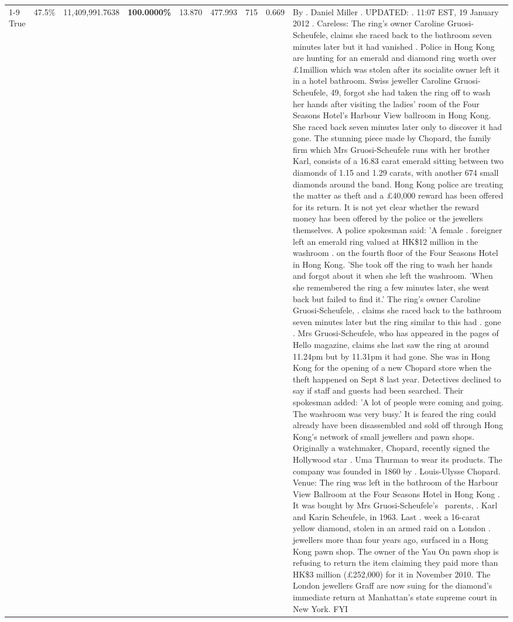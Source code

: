 \begin{table}[H]
\begin{tabular}{lllrlllll}
\cline{1-9}
True & 47.5\% & 11,409,991.7638 & \bfseries \color{red} 100.0000\% & 13.870 & 477.993 & 715 & 0.669 & By . Daniel Miller . UPDATED: . 11:07 EST, 19 January 2012 . Careless: The ring's owner Caroline Gruosi-Scheufele, claims she raced back to the bathroom seven minutes later but it had vanished . Police in Hong Kong are hunting for an emerald and diamond ring worth over £1million which was stolen after its socialite owner left it in a hotel bathroom. Swiss jeweller Caroline Gruosi-Scheufele, 49, forgot she had taken the ring off to wash her hands after visiting the ladies' room of the Four Seasons Hotel's Harbour View ballroom in Hong Kong. She raced back seven minutes later only to discover it had gone. The stunning piece made by Chopard, the family firm which Mrs Gruosi-Scheufele runs with her brother Karl, consists of a 16.83 carat emerald sitting between two diamonds of 1.15 and 1.29 carats, with another 674 small diamonds around the band. Hong Kong police are treating the matter as theft and a £40,000 reward has been offered for its return. It is not yet clear whether the reward money has been offered by the police or the jewellers themselves. A police spokesman said: 'A female . foreigner left an emerald ring valued at HK\$12 million in the washroom . on the fourth floor of the Four Seasons Hotel in Hong Kong. 'She took off the ring to wash her hands and forgot about it when she left the washroom. 'When she remembered the ring a few minutes later, she went back but failed to find it.' The ring's owner Caroline Gruosi-Scheufele, . claims she raced back to the bathroom seven minutes later but the ring similar to this had . gone . Mrs Gruosi-Scheufele, who has appeared in the pages of Hello magazine, claims she last saw the ring at around 11.24pm but by 11.31pm it had gone. She was in Hong Kong for the opening of a new Chopard store when the theft happened on Sept 8 last year. Detectives declined to say if staff and guests had been searched. Their spokesman added: 'A lot of people were coming and going. The washroom was very busy.' It is feared the ring could already have been disassembled and sold off through Hong Kong's network of small jewellers and pawn shops. Originally a watchmaker, Chopard, recently signed the Hollywood star . Uma Thurman to wear its products. The company was founded in 1860 by . Louis-Ulysse Chopard. Venue: The ring was left in the bathroom of the Harbour View Ballroom at the Four Seasons Hotel in Hong Kong . It was bought by Mrs Gruosi-Scheufele's  parents, . Karl and Karin Scheufele, in 1963. Last . week a 16-carat yellow diamond, stolen in an armed raid on a London . jewellers more than four years ago, surfaced in a Hong Kong pawn shop. The owner of the Yau On pawn shop is refusing to return the item claiming they paid more than HK\$3 million (£252,000) for it in November 2010. The London jewellers Graff are now suing for the diamond’s immediate return at Manhattan’s state supreme court in New York. FYI \\

\end{tabular}
\end{table}
